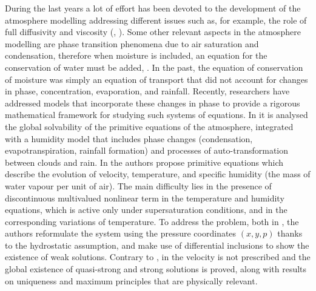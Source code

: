 \documentclass[11pt, a4paper, article,reqno,]{amsart}
\theoremstyle{remark}
\numberwithin{equation}{section}
\begin{document}
During the last years a lot of effort has been devoted to the development of the atmosphere modelling addressing different issues such as, for example, the role of full diffusivity and viscosity  (\cite{CLT14}, \cite{CLT16}).  Some other relevant aspects in the atmosphere modelling are phase transition phenomena due to air saturation and condensation, therefore when moisture is included, an equation for the conservation of water must be added,  \cite{LTW, GH06}. In the past, the equation of conservation of moisture was simply an equation of transport that did not account for changes in phase, concentration, evaporation, and rainfall. Recently, researchers have addressed models that incorporate these changes in phase to provide a rigorous mathematical framework for studying such systems of equations. In \cite{HKLT} it is analysed the global solvability of the primitive equations of the atmosphere, integrated with a humidity model that includes phase changes (condensation, evapotranspiration, rainfall formation) and processes of auto-transformation between clouds and rain. In  \cite{BCZ,CZ,LT}  the authors propose primitive equations which describe the evolution of velocity, temperature, and specific humidity (the mass of water vapour per unit of air). The main difficulty lies in the presence of discontinuous multivalued nonlinear term in the temperature and humidity equations, which is active only under supersaturation conditions, and in the corresponding variations of temperature. To address the problem, both in \cite{BCZ,CZ}, the authors reformulate the system using the pressure coordinates $(x,y,p)$ thanks to the hydrostatic assumption, and make use of differential inclusions to show the existence of weak solutions. Contrary to \cite{BCZ}, in \cite{CZ} the velocity is not prescribed and the global existence of quasi-strong and strong solutions is proved, along with results on uniqueness and maximum principles that are physically relevant. 
\end{document}
